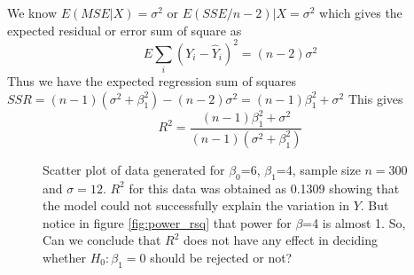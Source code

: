 \documentclass[11pt]{article}
\begin{document}
We know $E(MSE|X) = \sigma^2$ or $E(SSE/n-2)|X = \sigma^2$ which gives the expected residual or error sum of square as $$E \sum_i (Y_i-\hat Y_i)^2=(n-2)\sigma^2$$
Thus we have the expected regression sum of squares $SSR =  (n-1)(\sigma^2+\beta_1^2) - (n-2)\sigma^2 = (n-1) \beta_1^2+\sigma^2$ This gives $$R^2=\frac{(n-1) \beta_1^2+\sigma^2}{ (n-1)(\sigma^2+\beta_1^2)}$$


\begin{figure}[hbtp]
   \centering
       \caption{Scatter plot of data generated for $\beta_0$=6, $\beta_1$=4, sample size $n =300$ and $\sigma = 12$. $R^2$ for this data was obtained as 0.1309 showing that the model could not successfully explain the variation in $Y$. But notice in figure \ref{fig:power_rsq} that power for $\beta$=4 is almost 1. So, Can we conclude that $R^2$ does not have any effect in deciding whether $H_0: \beta_1=0$ should be rejected or not?}
       \label{fig:plot_beta_4}
\end{figure}
\end{document}
